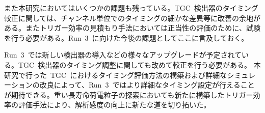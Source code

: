 また本研究においてはいくつかの課題も残っている。TGC~検出器のタイミング較正に関しては、チャンネル単位でのタイミングの細かな差異等に改善の余地がある。またトリガー効率の見積もり手法においては正当性の評価のために、試験を行う必要がある。Run~3~に向けた今後の課題としてここに言及しておく。

Run~3~では新しい検出器の導入などの様々なアップグレードが予定されている。TGC~検出器のタイミング調整に関しても改めて較正を行う必要がある。
本研究で行った~TGC~におけるタイミング評価方法の構築および詳細なシミュレーションの改良によって、Run~3~ではより詳細なタイミング設定が行えることが期待できる。重い長寿命荷電粒子の探索においても新たに構築したトリガー効率の評価手法により、解析感度の向上に新たな道を切り拓いた。